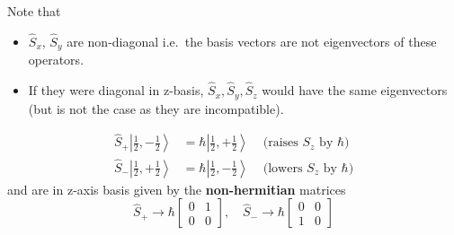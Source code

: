 Note that
\begin{itemize}
    \item $\widehat{S}_{x}$, $\widehat{S}_{y}$ are non-diagonal i.e.\ the basis vectors are not eigenvectors of these operators.
    \item If they were diagonal in z-basis, $\widehat{S}_{x},\widehat{S}_{y},\widehat{S}_{z}$ would have the same eigenvectors (but is not the case as they are incompatible).
\end{itemize}

\newpar{}
\begin{align*}
    \widehat{S}_{+}\left|\frac{1}{2},-\frac{1}{2}\right> & =\hbar\left|\frac{1}{2},+\frac{1}{2}\right> & \text{ (raises $S_z$ by $\hbar$)} \\
    \widehat{S}_{-}\left|\frac{1}{2},+\frac{1}{2}\right> & =\hbar\left|\frac{1}{2},-\frac{1}{2}\right> & \text{ (lowers $S_z$ by $\hbar$)}
\end{align*}
and are in z-axis basis given by the \textbf{non-hermitian} matrices
\begin{equation*}
    \widehat{S}_{+}  \rightarrow \hbar\begin{bmatrix}
                                           0 & 1 \\
                                           0 & 0
                                       \end{bmatrix},\quad
    \widehat{S}_{-}  \rightarrow \hbar\begin{bmatrix}
                                           0 & 0 \\
                                           1 & 0
                                       \end{bmatrix}
\end{equation*}